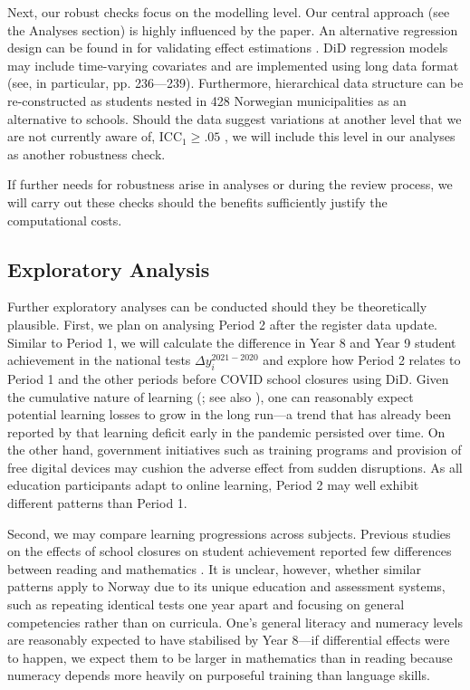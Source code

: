 Next, our robust checks focus on the modelling level. Our central approach (see the Analyses section) is highly influenced by the \textcite{engzell:2021} paper. An alternative regression design can be found in \textcite{angrist:2009} for validating effect estimations \parencite[see also ][]{brumback:2021}.  DiD regression models may include time-varying covariates and are implemented using long data format (see, in particular, pp. 236—239). Furthermore, hierarchical data structure can be re-constructed as students nested in 428 Norwegian municipalities as an alternative to schools. Should the data suggest variations at another level that we are not currently aware of, $\text{ICC}_1 \geq .05$ \parencite{lebreton:2008}, we will include this level in our analyses as another robustness check.

If further needs for robustness arise in analyses or during the review process, we will carry out these checks should the benefits sufficiently justify the computational costs.

\subsection{Exploratory Analysis}

Further exploratory analyses can be conducted should they be theoretically plausible. First, we plan on analysing Period 2 after the register data update. Similar to Period 1, we will calculate the difference in Year 8 and Year 9 student achievement in the national tests $\Delta y_i^{2021-2020}$ and explore how Period 2 relates to Period 1 and the other periods before COVID school closures using DiD. Given the cumulative nature of learning (; see also ), one can reasonably expect potential learning losses to grow in the long run---a trend that has already been reported by \textcite{betthauser:2022} that learning deficit early in the pandemic persisted over time. On the other hand, government initiatives such as training programs and provision of free digital devices may cushion the adverse effect from sudden disruptions. As all education participants adapt to online learning, Period 2 may well exhibit different patterns than Period 1.

Second, we may compare learning progressions across subjects. Previous studies on the effects of school closures on student achievement reported few differences between reading and mathematics \parencite{hammerstein:2021}. It is unclear, however, whether similar patterns apply to Norway due to its unique education and assessment systems, such as repeating identical tests one year apart and focusing on general competencies rather than on curricula. One's general literacy and numeracy levels are reasonably expected to have stabilised by Year 8---if differential effects were to happen, we expect them to be larger in mathematics than in reading because numeracy depends more heavily on purposeful training than language skills.

